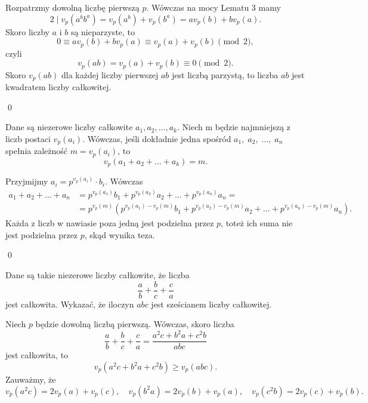 \vspace{5px}


\noindent
Rozpatrzmy dowolną liczbę pierwszą $p$. Wówczas na mocy Lematu $3$ mamy
\[
	2 \mid v_p(a^bb^a) = v_p(a^b) + v_p(b^a) = av_p(b) + bv_p(a).
\]
Skoro liczby $a$ i $b$ są nieparzyste, to
\[
	0 \equiv av_p(b) + bv_p(a) \equiv v_p(a) + v_p(b) \pmod{2},
\]
czyli
\[
	v_p(ab) = v_p(a) + v_p(b) \equiv 0 \pmod{2}.
\]
Skoro $v_p(ab)$ dla każdej liczby pierwszej $ab$ jest liczbą parzystą, to liczba $ab$ jest kwadratem liczby całkowitej.

\qed


\noindent
Dane są niezerowe liczby całkowite $a_1, a_2, ..., a_k$. Niech m będzie najmniejszą z liczb postaci $v_p(a_i)$. Wówczas, jeśli dokładnie jedna spośród $a_1, \; a_2, \; ..., \; a_n$ spełnia zależność $m = v_p(a_i)$, to
\[
	v_p(a_1 + a_2 + ... + a_k) = m.
\]

\vspace{5px}


\noindent
Przyjmijmy $a_i = p^{v_p(a_i)} \cdot b_i$. Wówczas
\begin{align*}
	a_1 + a_2 + ... + a_n &= p^{v_p(a_1)}b_1 + p^{v_p(a_2)}a_2 + ... + p^{v_p(a_n)}a_n = \\
	&= p^{v_p(m)}\left(p^{v_p(a_1) - v_p(m)}b_1 + p^{v_p(a_2) - v_p(m)}a_2 + ... + p^{v_p(a_n) - v_p(m)}a_n\right).
\end{align*}
Każda z liczb w nawiasie poza jedną jest podzielna przez $p$, toteż ich suma nie jest podzielna przez $p$, skąd wynika teza.

\qed


\noindent
Dane są takie niezerowe liczby całkowite, że liczba
\[
	\frac{a}{b} + \frac{b}{c} + \frac{c}{a}
\]
jest całkowita. Wykazać, że iloczyn $abc$ jest sześcianem liczby całkowitej.

\vspace{5px}


\noindent
Niech $p$ będzie dowolną liczbą pierwszą. Wówczas, skoro liczba
\[
	\frac{a}{b} + \frac{b}{c} + \frac{c}{a} = \frac{a^2c + b^2a + c^2b}{abc}
\]
jest całkowita, to
\[
	v_p(a^2c + b^2a + c^2b) \geqslant v_p(abc).
\]
Zauważmy, że
\[
	v_p(a^2c) = 2v_p(a) + v_p(c), \quad v_p(b^2a) = 2v_p(b) + v_p(a), \quad v_p(c^2b) = 2v_p(c) + v_p(b).
\]

